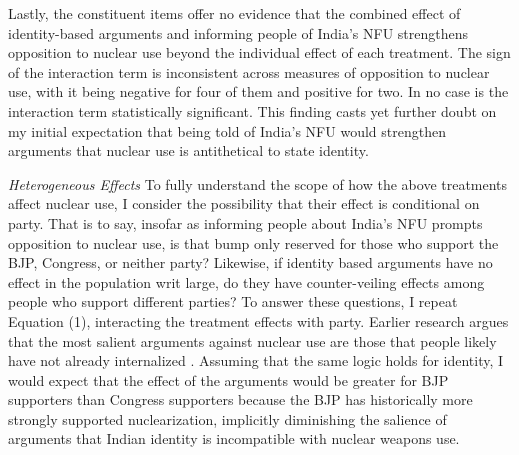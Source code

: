 \documentclass[12pt]{article}
\begin{document}
Lastly, the constituent items offer no evidence that the combined effect of identity-based arguments and informing people of India's NFU strengthens opposition to nuclear use beyond the individual effect of each treatment. The sign of the interaction term is inconsistent across measures of opposition to nuclear use, with it being negative for four of them and positive for two. In no case is the interaction term statistically significant. This finding casts yet further doubt on my initial expectation that being told of India's NFU would strengthen arguments that nuclear use is antithetical to state identity.

\textit{Heterogeneous Effects} To fully understand the scope of how the above treatments affect nuclear use, I consider the possibility that their effect is conditional on party. That is to say, insofar as informing people about India's NFU prompts opposition to nuclear use, is that bump only reserved for those who support the BJP, Congress, or neither party? Likewise, if identity based arguments have no effect in the population writ large, do they have counter-veiling effects among people who support different parties? To answer these questions, I repeat Equation (1), interacting the treatment effects with party. Earlier research argues that the most salient arguments against nuclear use are those that people likely have not already internalized \citep{sagan_atomic_2024}. Assuming that the same logic holds for identity, I would expect that the effect of the arguments would be greater for BJP supporters than Congress supporters because the BJP has historically more strongly supported nuclearization, implicitly diminishing the salience of arguments that Indian identity is incompatible with nuclear weapons use.
\end{document}
